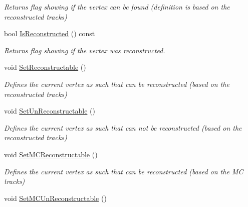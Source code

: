\begin{DoxyCompactItemize}
\begin{DoxyCompactList}\small\item\em Returns flag showing if the vertex can be found (definition is based on the reconstructed tracks) \end{DoxyCompactList}\item 
bool \hyperlink{classKFMCVertex_a46ac54d0520553cccee1e7f7217fe3fd}{Is\+Reconstructed} () const \hypertarget{classKFMCVertex_a46ac54d0520553cccee1e7f7217fe3fd}{}\label{classKFMCVertex_a46ac54d0520553cccee1e7f7217fe3fd}

\begin{DoxyCompactList}\small\item\em Returns flag showing if the vertex was reconstructed. \end{DoxyCompactList}\item 
void \hyperlink{classKFMCVertex_a116a277479a9eb7523202023d6bbd6ba}{Set\+Reconstructable} ()\hypertarget{classKFMCVertex_a116a277479a9eb7523202023d6bbd6ba}{}\label{classKFMCVertex_a116a277479a9eb7523202023d6bbd6ba}

\begin{DoxyCompactList}\small\item\em Defines the current vertex as such that can be reconstructed (based on the reconstructed tracks) \end{DoxyCompactList}\item 
void \hyperlink{classKFMCVertex_a0c8c2b357bbb7c690cfeb22fc025e795}{Set\+Un\+Reconstructable} ()\hypertarget{classKFMCVertex_a0c8c2b357bbb7c690cfeb22fc025e795}{}\label{classKFMCVertex_a0c8c2b357bbb7c690cfeb22fc025e795}

\begin{DoxyCompactList}\small\item\em Defines the current vertex as such that can not be reconstructed (based on the reconstructed tracks) \end{DoxyCompactList}\item 
void \hyperlink{classKFMCVertex_a2b334e879e9b429c7acebd727ac99ee1}{Set\+M\+C\+Reconstructable} ()\hypertarget{classKFMCVertex_a2b334e879e9b429c7acebd727ac99ee1}{}\label{classKFMCVertex_a2b334e879e9b429c7acebd727ac99ee1}

\begin{DoxyCompactList}\small\item\em Defines the current vertex as such that can be reconstructed (based on the MC tracks) \end{DoxyCompactList}\item 
void \hyperlink{classKFMCVertex_ac6fdfcc77e19dd3cc75de49b01843574}{Set\+M\+C\+Un\+Reconstructable} ()\hypertarget{classKFMCVertex_ac6fdfcc77e19dd3cc75de49b01843574}{}\label{classKFMCVertex_ac6fdfcc77e19dd3cc75de49b01843574}


\end{DoxyCompactItemize}
